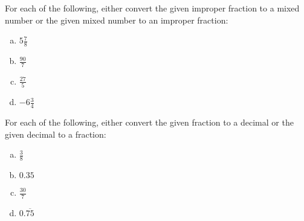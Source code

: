 \documentclass[11pt,letterpaper]{article}
\begin{document}
\newpage



 For each of the following, either convert the given improper fraction to a mixed number or the given mixed number to an improper fraction:
	\begin{enumerate}[(a)]
	\item $5 \frac{7}{8}$
	\item $\frac{90}{7}$
	\item $\frac{27}{5}$
	\item $-6 \frac{3}{4}$
	\end{enumerate}



\newpage



 For each of the following, either convert the given fraction to a decimal or the given decimal to a fraction:
	\begin{enumerate}[(a)]
	\item $\frac{3}{8}$
	\item $0.35$
	\item $\frac{30}{7}$
	\item $0.\overline{75}$
	\end{enumerate}
\end{document}
